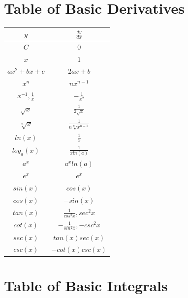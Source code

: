 \documentclass[12pt, letterpaper]{article}
\begin{document}
\begin{multicols}{2}

\section{Table of Basic Derivatives}
\begin{center}
\begin{tabular}{|c|c|}
\hline
$y$ & $\frac{dy}{dx}$\\
\hline
$C$ & $0$\\
\hline
$x$ & $1$\\
\hline
$ax^2 + bx + c$ & $2ax+b$\\
\hline
$x^n$ & $nx^{n-1}$\\
\hline
$x^{-1}, \frac{1}{x}$ & $-\frac{1}{x^2}$\\
\hline
$\sqrt{x}$ & $\frac{1}{2\sqrt{x}}$\\
\hline
$\sqrt[n]{x}$ & $\frac{1}{n\sqrt[n]{x^{n-1}}}$\\
\hline
$ln(x)$ & $\frac{1}{x}$\\
\hline
$log_a (x)$ & $\frac{1}{x ln(a)}$\\
\hline
$a^x$ & $a^x ln (a)$\\
\hline
$e^x$ & $e^x$\\
\hline
$sin(x)$ & $cos(x)$\\
\hline
$cos(x)$ & $-sin(x)$\\
\hline
$tan(x)$ & $\frac{1}{cos^2 x}, sec^2 x$\\
\hline
$cot(x)$ & $-\frac{1}{sin^2 x}, -csc^2 x$\\
\hline
$sec(x)$ & $tan(x) sec(x)$\\
\hline
$csc(x)$ & $-cot(x) csc(x)$\\
\hline
\end{tabular}
\end{center}

\columnbreak

\section{Table of Basic Integrals}


\end{multicols}
\end{document}
